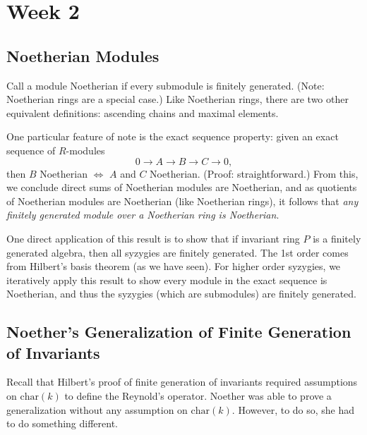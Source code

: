 \section{Week 2}

\subsection{Noetherian Modules}
Call a module Noetherian if every submodule is finitely generated. (Note: Noetherian rings are a special case.) Like Noetherian rings, there are two other equivalent definitions: ascending chains and maximal elements.

One particular feature of note is the exact sequence property: given an exact sequence of $R$-modules
\[
    0 \to A \to B \to C \to 0,
\]
then $B$ Noetherian $\iff$ $A$ and $C$ Noetherian. (Proof: straightforward.) From this, we conclude direct sums of Noetherian modules are Noetherian, and as quotients of Noetherian modules are Noetherian (like Noetherian rings), it follows that \textit{any finitely generated module over a Noetherian ring is Noetherian}.

One direct application of this result is to show that if invariant ring $P$ is a finitely generated algebra, then all syzygies are finitely generated. The 1st order comes from Hilbert's basis theorem (as we have seen). For higher order syzygies, we iteratively apply this result to show every module in the exact sequence is Noetherian, and thus the syzygies (which are submodules) are finitely generated.

\subsection{Noether's Generalization of Finite Generation of Invariants}
Recall that Hilbert's proof of finite generation of invariants required assumptions on $\text{char}(k)$ to define the Reynold's operator. Noether was able to prove a generalization without any assumption on $\text{char}(k)$. However, to do so, she had to do something different.

